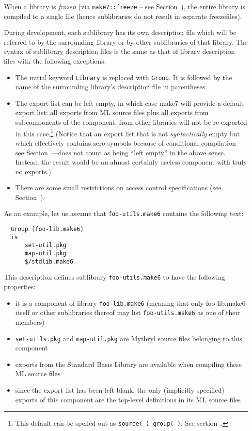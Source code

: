 When a library is {\em frozen} (via {\tt make7::freeze} -- see
Section~), the entire library is compiled to a single
file (hence sublibraries do not result in separate freezefiles).

During development, each sublibrary has its own description file which will
be referred to by the surrounding library or by other sublibraries of that
library. The syntax of sublibrary description files is the same as that of
library description files with the following exceptions:

\begin{itemize}
\item The initial keyword {\tt Library} is replaced with {\tt Group}.
It is followed by the name of the surrounding library's description
file in parentheses.
\item The export list can be left empty, in which case make7 will provide
a default export list: all exports from ML source files plus all
exports from subcomponents of the component. from other libraries will
not be re-exported in this case.\footnote{This default can be spelled
out as {\tt source(-) group(-)}.  See
section~.}  (Notice that an export list that
is not {\em syntactically} empty but which effectively contains zero
symbols because of conditional compilation---see
Section~---does not count as being ``left empty'' in
the above sense.  Instead, the result would be an almost certainly
useless component with truly no exports.)
\item There are some small restrictions on access control
specifications (see Section~).
\end{itemize}

As an example, let us assume that
{\tt foo-utils.make6} contains the following text:

\begin{verbatim}
  Group (foo-lib.make6)
  is
      set-util.pkg
      map-util.pkg
      $/stdlib.make6
\end{verbatim}

This description defines sublibrary {\tt foo-utils.make6} to have the
following properties:

\begin{itemize}
\item it is a component of library {\tt foo-lib.make6} (meaning that only
foo-lib.make6 itself or other sublibraries thereof may list {\tt foo-utils.make6} as one
of their members)
\item {\tt set-utils.pkg} and {\tt map-util.pkg} are Mythryl source files
belonging to this component
\item exports from the Standard Basis Library are available when
compiling these ML source files
\item since the export list has been left blank, the only (implicitly
specified) exports of this component are the top-level definitions in
its ML source files
\end{itemize}

